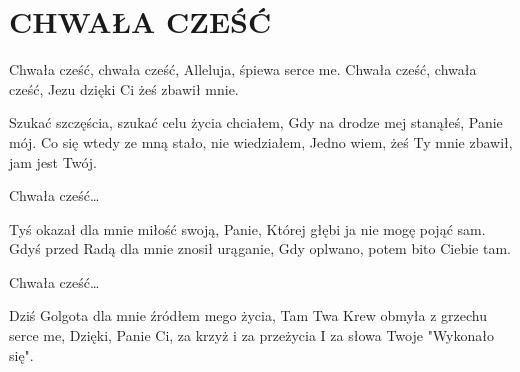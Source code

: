 \documentclass[../../../songbook.tex]{subfiles}
\begin{document}
\TabPositions{8cm} %
\section*{CHWAŁA CZEŚĆ}
\vspace{0.5cm}
\-\hspace{1cm} Chwała cześć, chwała cześć, 		 \newline
\-\hspace{1cm} Alleluja, śpiewa serce me. 		 \newline
\-\hspace{1cm} Chwała cześć, chwała cześć, 		 \newline
\-\hspace{1cm} Jezu dzięki Ci żeś zbawił mnie. 		 \newline

Szukać szczęścia, szukać celu życia chciałem, 		 \newline
Gdy na drodze mej stanąłeś, Panie mój. 		 \newline
Co się wtedy ze mną stało, nie wiedziałem, 		 \newline
Jedno wiem, żeś Ty mnie zbawił, jam jest Twój. 		 \newline

\-\hspace{1cm} Chwała cześć…			\newline

Tyś okazał dla mnie miłość swoją, Panie, 			\newline
Której głębi ja nie mogę pojąć sam. 			\newline
Gdyś przed Radą dla mnie znosił urąganie, 			\newline
Gdy oplwano, potem bito Ciebie tam. 			\newline

\-\hspace{1cm} Chwała cześć…			\newline

Dziś Golgota dla mnie źródłem mego życia, 			\newline
Tam Twa Krew obmyła z grzechu serce me, 			\newline
Dzięki, Panie Ci, za krzyż i za przeżycia 			\newline
I za słowa Twoje "Wykonało się". 			\newline
\end{document}
